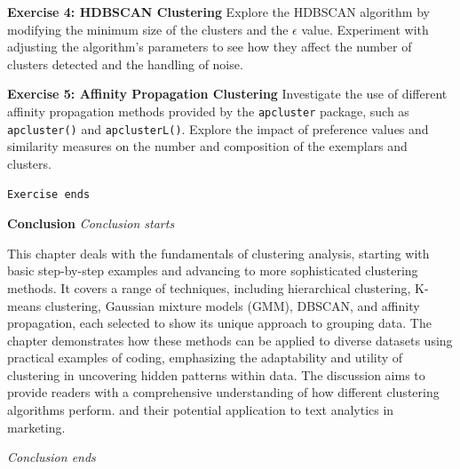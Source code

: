\textbf{Exercise 4: HDBSCAN Clustering} Explore the HDBSCAN algorithm by
modifying the minimum size of the clusters and the \(\epsilon\) value.
Experiment with adjusting the algorithm's parameters to see how they
affect the number of clusters detected and the handling of noise.

\textbf{Exercise 5: Affinity Propagation Clustering} Investigate the use
of different affinity propagation methods provided by the
\texttt{apcluster} package, such as \texttt{apcluster()} and
\texttt{apclusterL()}. Explore the impact of preference values and
similarity measures on the number and composition of the
exemplars and clusters.

\texttt{Exercise\ ends}

\textbf{Conclusion} \emph{Conclusion starts}

This chapter deals with the fundamentals of clustering analysis,
starting with basic step-by-step examples and advancing to more
sophisticated clustering methods. It covers a range of techniques,
including hierarchical clustering, K-means clustering, Gaussian mixture models
(GMM), DBSCAN, and affinity propagation, each selected to show its
unique approach to grouping data. The
chapter demonstrates how these methods can be applied to diverse
datasets using practical examples of coding, emphasizing the adaptability and utility of clustering in
uncovering hidden patterns within data. The discussion aims to provide
readers with a comprehensive understanding of how different clustering
algorithms perform. and their potential application to text analytics in
marketing.

\emph{Conclusion ends}
